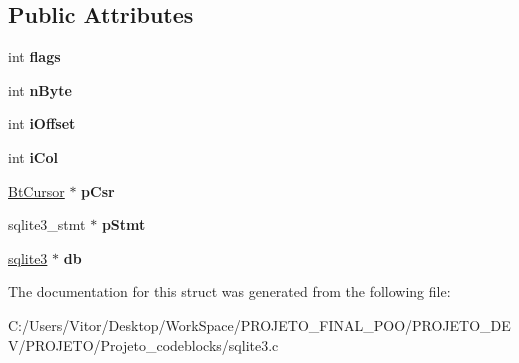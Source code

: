 \subsection*{Public Attributes}
\begin{DoxyCompactItemize}
\item 
\hypertarget{struct_incrblob_a46fa093e5241305f28d02926f8d0846f}{int {\bfseries flags}}\label{struct_incrblob_a46fa093e5241305f28d02926f8d0846f}

\item 
\hypertarget{struct_incrblob_ab1e1439df086208173fa97003f0ee02b}{int {\bfseries n\-Byte}}\label{struct_incrblob_ab1e1439df086208173fa97003f0ee02b}

\item 
\hypertarget{struct_incrblob_af8e71744f43178967460b9f402e7fafd}{int {\bfseries i\-Offset}}\label{struct_incrblob_af8e71744f43178967460b9f402e7fafd}

\item 
\hypertarget{struct_incrblob_a398a322b061fb9952bc155026976ba51}{int {\bfseries i\-Col}}\label{struct_incrblob_a398a322b061fb9952bc155026976ba51}

\item 
\hypertarget{struct_incrblob_af5a24b18473d1449c8c3fe7d826de59a}{\hyperlink{struct_bt_cursor}{Bt\-Cursor} $\ast$ {\bfseries p\-Csr}}\label{struct_incrblob_af5a24b18473d1449c8c3fe7d826de59a}

\item 
\hypertarget{struct_incrblob_a8b7b39c9372db552add74c69f14a61a3}{sqlite3\-\_\-stmt $\ast$ {\bfseries p\-Stmt}}\label{struct_incrblob_a8b7b39c9372db552add74c69f14a61a3}

\item 
\hypertarget{struct_incrblob_a9d3fe0b0229b75b9d0f9ee8e6545b5bc}{\hyperlink{structsqlite3}{sqlite3} $\ast$ {\bfseries db}}\label{struct_incrblob_a9d3fe0b0229b75b9d0f9ee8e6545b5bc}

\end{DoxyCompactItemize}


The documentation for this struct was generated from the following file\-:\begin{DoxyCompactItemize}
\item 
C\-:/\-Users/\-Vitor/\-Desktop/\-Work\-Space/\-P\-R\-O\-J\-E\-T\-O\-\_\-\-F\-I\-N\-A\-L\-\_\-\-P\-O\-O/\-P\-R\-O\-J\-E\-T\-O\-\_\-\-D\-E\-V/\-P\-R\-O\-J\-E\-T\-O/\-Projeto\-\_\-codeblocks/sqlite3.\-c\end{DoxyCompactItemize}
